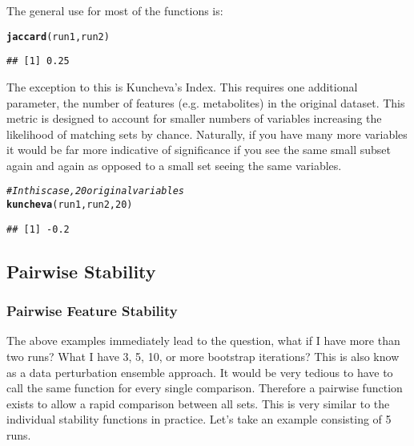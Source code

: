 \documentclass[12pt]{article}\usepackage[]{graphicx}\usepackage[usenames,dvipsnames]{color}
\makeatletter
\newcommand{\hlnum}[1]{\textcolor[rgb]{0.686,0.059,0.569}{#1}}%
\newcommand{\hlcom}[1]{\textcolor[rgb]{0.678,0.584,0.686}{\textit{#1}}}%
\newcommand{\hlstd}[1]{\textcolor[rgb]{0.345,0.345,0.345}{#1}}%
\newcommand{\hlkwd}[1]{\textcolor[rgb]{0.737,0.353,0.396}{\textbf{#1}}}%
\newenvironment{kframe}{%
 \def\at@end@of@kframe{}%
 \ifinner\ifhmode%
  \def\at@end@of@kframe{\end{minipage}}%
  \begin{minipage}{\columnwidth}%
 \fi\fi%
 \def\FrameCommand##1{\hskip\@totalleftmargin \hskip-\fboxsep
 \colorbox{shadecolor}{##1}\hskip-\fboxsep
     \hskip-\linewidth \hskip-\@totalleftmargin \hskip\columnwidth}%
 \MakeFramed {\advance\hsize-\width
   \@totalleftmargin\z@ \linewidth\hsize
   \@setminipage}}%
 {\par\unskip\endMakeFramed%
 \at@end@of@kframe}
\newenvironment{knitrout}{}{} %
\makeatother
\begin{document}
The general use for most of the functions is:

\begin{knitrout}
\color{fgcolor}\begin{kframe}
\begin{alltt}
\hlkwd{jaccard}\hlstd{(run1, run2)}
\end{alltt}
\begin{verbatim}
## [1] 0.25
\end{verbatim}
\end{kframe}
\end{knitrout}

The exception to this is Kuncheva's Index.  This requires one additional
parameter, the number of features (e.g. metabolites) in the original dataset.
This metric is designed to account for smaller numbers of variables increasing
the likelihood of matching sets by chance.  Naturally, if you have many more
variables it would be far more indicative of significance if you see the same
small subset again and again as opposed to a small set seeing the same 
variables.

\begin{knitrout}
\color{fgcolor}\begin{kframe}
\begin{alltt}
\hlcom{# In this case, 20 original variables}
\hlkwd{kuncheva}\hlstd{(run1, run2,} \hlnum{20}\hlstd{)}
\end{alltt}
\begin{verbatim}
## [1] -0.2
\end{verbatim}
\end{kframe}
\end{knitrout}

\newpage
\subsection{Pairwise Stability}
\subsubsection{Pairwise Feature Stability}

The above examples immediately lead to the question, what if I have more than
two runs?  What I have 3, 5, 10, or more bootstrap iterations?  This is also
know as a data perturbation ensemble approach.  It would be  very tedious to 
have to call the same function for every single comparison.  Therefore a 
pairwise function exists to allow a rapid comparison between all sets.  
This  is very similar to the individual 
stability functions in practice.  Let's take an example consisting of 5 runs.
\end{document}
